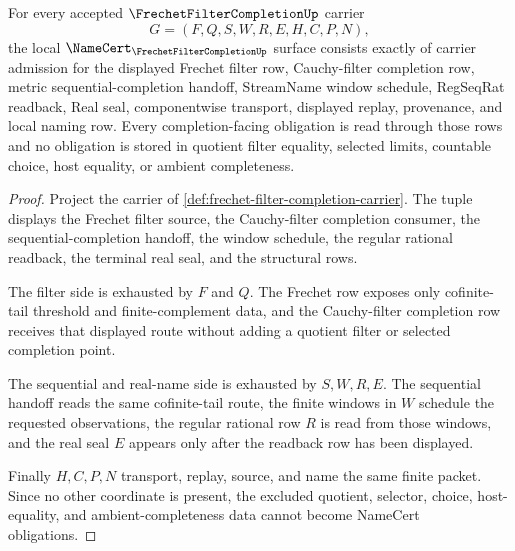 \begin{theorem}
\label{thm:frechet-filter-completion-namecert-obligations}
For every accepted $\FrechetFilterCompletionUp$ carrier
$$
G=(F,Q,S,W,R,E,H,C,P,N),
$$
the local $\NameCert_{\FrechetFilterCompletionUp}$ surface consists exactly of carrier admission for the displayed Frechet filter row, Cauchy-filter completion row, metric sequential-completion handoff, StreamName window schedule, RegSeqRat readback, Real seal, componentwise transport, displayed replay, provenance, and local naming row. Every completion-facing obligation is read through those rows and no obligation is stored in quotient filter equality, selected limits, countable choice, host equality, or ambient completeness.
\end{theorem}
\begin{proof}
Project the carrier of \autoref{def:frechet-filter-completion-carrier}. The tuple displays the Frechet filter source, the Cauchy-filter completion consumer, the sequential-completion handoff, the window schedule, the regular rational readback, the terminal real seal, and the structural rows.

The filter side is exhausted by $F$ and $Q$. The Frechet row exposes only cofinite-tail threshold and finite-complement data, and the Cauchy-filter completion row receives that displayed route without adding a quotient filter or selected completion point.

The sequential and real-name side is exhausted by $S,W,R,E$. The sequential handoff reads the same cofinite-tail route, the finite windows in $W$ schedule the requested observations, the regular rational row $R$ is read from those windows, and the real seal $E$ appears only after the readback row has been displayed.

Finally $H,C,P,N$ transport, replay, source, and name the same finite packet. Since no other coordinate is present, the excluded quotient, selector, choice, host-equality, and ambient-completeness data cannot become NameCert obligations.
\end{proof}

